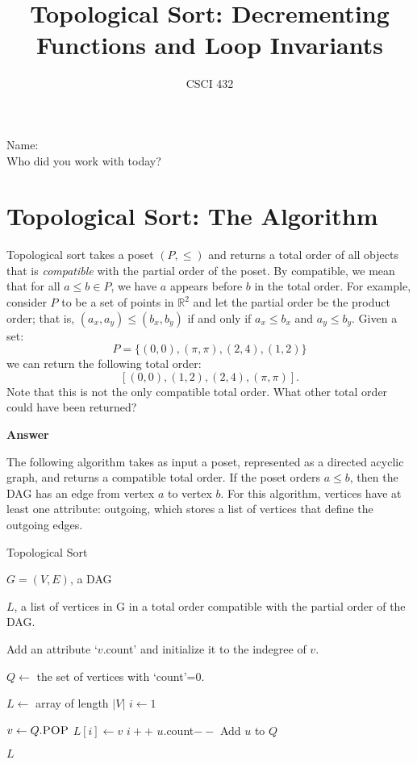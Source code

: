 \documentclass{article}
\title{Topological Sort: Decrementing Functions and Loop Invariants}
\author{CSCI 432}
\def\R{{\mathbb R}}
\begin{document}
\maketitle

\noindent
Name:\\
Who did you work with today?

\section*{Topological Sort: The Algorithm}

Topological sort takes a poset $(P,\leq)$ and returns a total order of all
objects that is \emph{compatible} with the partial order of the poset.  By
compatible, we mean that for all $a \leq b \in P$, we have $a$ appears before
$b$ in the total order.  For example, consider $P$ to be a set of points in
$\R^2$ and let the partial order be the product order; that is, $(a_x,a_y) \leq
(b_x,b_y)$ if and only if $a_x \leq b_x$ and $a_y \leq b_y$.  Given a set:
$$ P = \{ (0,0), (\pi, \pi), (2,4), (1,2) \}$$
we can return the following total order:
$$[ (0,0), (1,2), (2,4), (\pi, \pi)].$$
Note that this is not the only compatible total order.  What other total order
could have been returned?

\textbf{Answer}
\vspace{1in}

The following algorithm takes as input a poset, represented as a directed
acyclic graph, and returns a compatible total order.  If the poset orders $a
\leq b$, then the DAG has an edge from vertex $a$ to vertex $b$.  For this
algorithm, vertices have at least one attribute: outgoing, which stores a list
of vertices that define the outgoing edges.

\begin{algorithm}[h]
    \caption{Topological Sort}
    \begin{algorithmic}[1]
        \REQUIRE $G=(V,E)$, a DAG

        \ENSURE $L$, a list of vertices in G in a total order compatible with
        the partial order of the DAG.

            \STATE Add an attribute `$v$.count' and initialize it to the indegree of $v$.
        \ENDFOR

        \STATE $Q \gets$ the set of vertices with `count'=0.\label{ln:initQ}

        \STATE $L \gets$ array of length $|V|$
        \STATE $i \gets 1$

            \STATE $v \gets Q.\textsc{POP}$
            \STATE $L[i] \gets v$
            \STATE $i++$
                \STATE $u$.count$--$
                    \STATE Add $u$ to $Q$
                \ENDIF
            \ENDFOR
        \ENDWHILE

        \RETURN $L$
    \end{algorithmic}
\end{algorithm}
\end{document}
